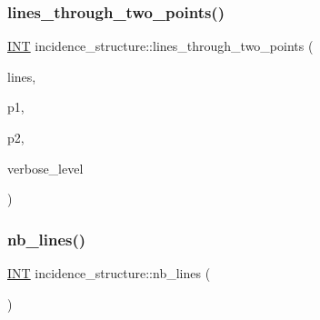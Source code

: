 \mbox{\label{classincidence__structure_ac64fa4f71495e9db3c2b3a301fd0c7f3}} 
\subsubsection{\texorpdfstring{lines\+\_\+through\+\_\+two\+\_\+points()}{lines\_through\_two\_points()}}
{\footnotesize\ttfamily \mbox{\hyperlink{galois_8h_a09fddde158a3a20bd2dcadb609de11dc}{I\+NT}} incidence\+\_\+structure\+::lines\+\_\+through\+\_\+two\+\_\+points (\begin{DoxyParamCaption}\item[{\mbox{\hyperlink{galois_8h_a09fddde158a3a20bd2dcadb609de11dc}{I\+NT}} $\ast$}]{lines,  }\item[{\mbox{\hyperlink{galois_8h_a09fddde158a3a20bd2dcadb609de11dc}{I\+NT}}}]{p1,  }\item[{\mbox{\hyperlink{galois_8h_a09fddde158a3a20bd2dcadb609de11dc}{I\+NT}}}]{p2,  }\item[{\mbox{\hyperlink{galois_8h_a09fddde158a3a20bd2dcadb609de11dc}{I\+NT}}}]{verbose\+\_\+level }\end{DoxyParamCaption})}

\mbox{\label{classincidence__structure_a9ffac61340b2a03f31f1cc366d5a7b79}} 
\subsubsection{\texorpdfstring{nb\+\_\+lines()}{nb\_lines()}}
{\footnotesize\ttfamily \mbox{\hyperlink{galois_8h_a09fddde158a3a20bd2dcadb609de11dc}{I\+NT}} incidence\+\_\+structure\+::nb\+\_\+lines (\begin{DoxyParamCaption}{ }\end{DoxyParamCaption})}

\mbox{\label{classincidence__structure_aff5f6bfdc7470e73082ee6faacf0af64}} 
